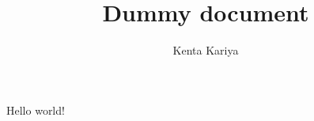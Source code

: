 \documentclass[a4paper,12pt]{article}
\title{Dummy document}
\author{Kenta Kariya}
\begin{document}
Hello world!
\end{document}
